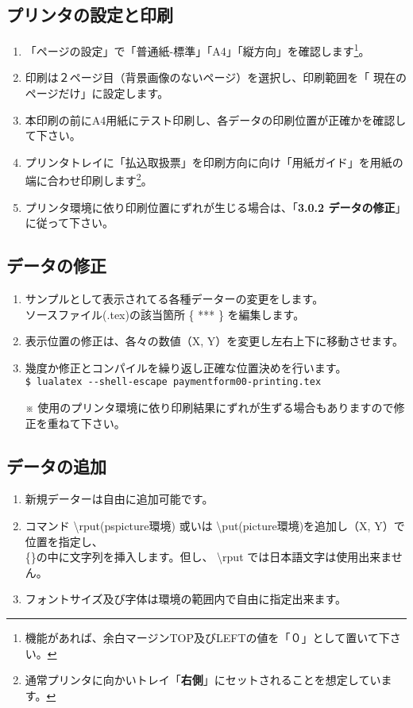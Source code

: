 \documentclass[a4paper,10pt,titlepage]{ltjsarticle}
\def\colH#1{\color[HTML]{#1}}
\def\bs#1{\textbackslash{#1}}
\begin{document}
\subsection{プリンタの設定と印刷}
\begin{enumerate}
  \item 「ページの設定」で「普通紙-標準」「A4」「縦方向」を確認します\footnote{機能があれば、余白マージンTOP及びLEFTの値を「０」として置いて下さい。}。
  \item 印刷は２ページ目（背景画像のないページ）を選択し、印刷範囲を「{\colH{800000} 現在のページだけ}」に設定します。
  \item 本印刷の前にA4用紙にテスト印刷し、各データの印刷位置が正確かを確認して下さい。
  \item プリンタトレイに「払込取扱票」を印刷方向に向け「用紙ガイド」を用紙の端に合わせ印刷します\footnote{通常プリンタに向かいトレイ「{\bfseries 右側}」にセットされることを想定しています。}。
  \item プリンタ環境に依り印刷位置にずれが生じる場合は、「{\bfseries 3.0.2 データの修正}」に従って下さい。

\end{enumerate}

\subsection{データの修正}
 \begin{enumerate}
   \item サンプルとして表示されてる各種データーの変更をします。\\
   ソースファイル(.tex)の該当箇所 \{\; *** \;\} を編集します。

   \item 表示位置の修正は、各々の数値（\;X, Y\;）を変更し左右上下に移動させます。

   \item 幾度か修正とコンパイルを繰り返し正確な位置決めを行います。\\
   \verb|$ lualatex --shell-escape paymentform00-printing.tex|           
  \item[※] 使用のプリンタ環境に依り印刷結果にずれが生ずる場合もありますので修正を重ねて下さい。
 \end{enumerate}

\subsection{データの追加}
 \begin{enumerate}
   \item 新規データーは自由に追加可能です。
   \item コマンド {\colH{800000} \bs rput}(pspicture環境) 或いは {\colH{800000} \bs put}(picture環境)を追加し（\;X, Y\;）で位置を指定し、\\
   \{\quad \}の中に文字列を挿入します。但し、 {\colH{800000} \bs rput では日本語文字は使用出来ません}。
   \item フォントサイズ及び字体は環境の範囲内で自由に指定出来ます。
   　
 \end{enumerate}
\end{document}
